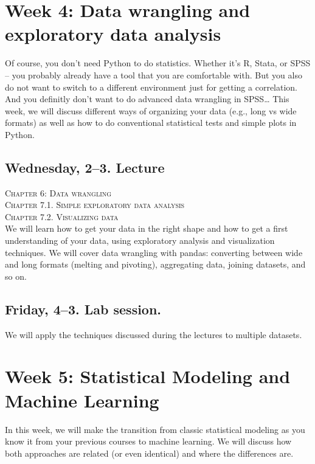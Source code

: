 

\section*{Week 4: Data wrangling and exploratory data analysis}
Of course, you don't need Python to do statistics. Whether it's R, Stata, or SPSS -- you probably already have a tool that you are comfortable with. But you also do not want to switch to a different environment just for getting a correlation. And you definitly don't want to do advanced data wrangling in SPSS\ldots
This week, we will discuss different ways of organizing your data (e.g., long vs wide formats) as well as how to do conventional statistical tests and simple plots in Python.


\subsection*{Wednesday, 2--3. Lecture}
\textsc{ Chapter 6: Data wrangling}\\
\textsc{ Chapter 7.1. Simple exploratory data analysis}\\
\textsc{ Chapter 7.2. Visualizing data}\\

We will learn how to get your data in the right shape and how to get a first understanding of your data, using exploratory analysis and visualization techniques. We will cover data wrangling with pandas: converting between wide and long formats (melting and pivoting), aggregating data, joining datasets, and so on.


\subsection*{Friday, 4--3. Lab session.}
We will apply the techniques discussed during the lectures to multiple datasets.




\section*{Week 5: Statistical Modeling and Machine Learning}
In this week, we will make the transition from classic statistical modeling as you know it from your previous courses to machine learning. We will discuss how both approaches are related  (or even identical) and where the differences are.


